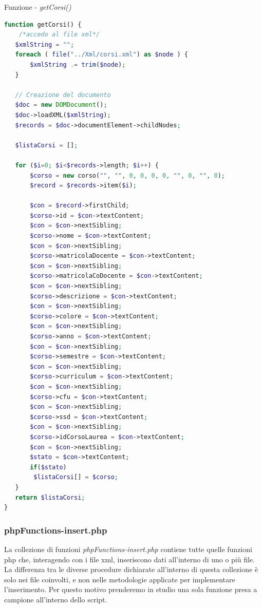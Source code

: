 \documentclass [a4paper,11pt]{book}
\begin{document}
Funzione - \emph{getCorsi()} 

\medskip

\begin{lstlisting}[language=PHP]
function getCorsi() {
    /*accedo al file xml*/
   $xmlString = "";
   foreach ( file("../Xml/corsi.xml") as $node ) {
       $xmlString .= trim($node);
   }
   
   // Creazione del documento
   $doc = new DOMDocument();
   $doc->loadXML($xmlString);
   $records = $doc->documentElement->childNodes;

   $listaCorsi = [];

   for ($i=0; $i<$records->length; $i++) {
       $corso = new corso("", "", 0, 0, 0, 0, "", 0, "", 0);
       $record = $records->item($i);
       
       $con = $record->firstChild;
       $corso->id = $con->textContent;
       $con = $con->nextSibling;
       $corso->nome = $con->textContent;
       $con = $con->nextSibling;
       $corso->matricolaDocente = $con->textContent;
       $con = $con->nextSibling;
       $corso->matricolaCoDocente = $con->textContent;
       $con = $con->nextSibling;
       $corso->descrizione = $con->textContent;
       $con = $con->nextSibling;
       $corso->colore = $con->textContent;
       $con = $con->nextSibling;
       $corso->anno = $con->textContent;
       $con = $con->nextSibling;
       $corso->semestre = $con->textContent;
       $con = $con->nextSibling;
       $corso->curriculum = $con->textContent;
       $con = $con->nextSibling;
       $corso->cfu = $con->textContent;
       $con = $con->nextSibling;
       $corso->ssd = $con->textContent;
       $con = $con->nextSibling;
       $corso->idCorsoLaurea = $con->textContent;
       $con = $con->nextSibling;
       $stato = $con->textContent;
       if($stato)
        $listaCorsi[] = $corso;
   }
   return $listaCorsi;
}

\end{lstlisting}

\medskip

\subsubsection{phpFunctions-insert.php}

La collezione di funzioni \emph{phpFunctions-insert.php} contiene tutte quelle funzioni php che, interagendo con i file xml, inseriscono dati all'interno di uno o più file. La differenza tra le diverse procedure dichiarate all'interno di questa collezione è solo nei file coinvolti, e non nelle metodologie applicate per implementare l'inserimento. Per questo motivo prenderemo in studio una sola funzione presa a campione all'interno dello script.
\end{document}
